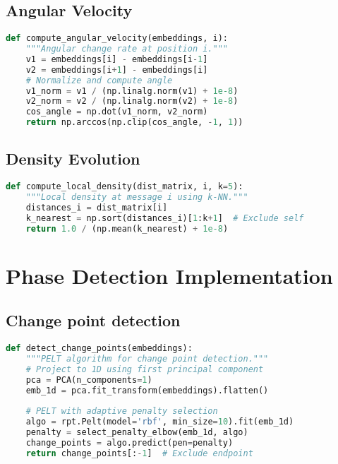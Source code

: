 \documentclass[11pt,letterpaper]{article}
\begin{document}
\subsection{Angular Velocity}
\label{app:geometric-signatures-angular-velocity}
\begin{lstlisting}[language=Python, basicstyle=\small]
def compute_angular_velocity(embeddings, i):
    """Angular change rate at position i."""
    v1 = embeddings[i] - embeddings[i-1]
    v2 = embeddings[i+1] - embeddings[i]
    # Normalize and compute angle
    v1_norm = v1 / (np.linalg.norm(v1) + 1e-8)
    v2_norm = v2 / (np.linalg.norm(v2) + 1e-8)
    cos_angle = np.dot(v1_norm, v2_norm)
    return np.arccos(np.clip(cos_angle, -1, 1))
\end{lstlisting}

\subsection{Density Evolution}
\label{app:geometric-signatures-density-evolution}
\begin{lstlisting}[language=Python, basicstyle=\small]
def compute_local_density(dist_matrix, i, k=5):
    """Local density at message i using k-NN."""
    distances_i = dist_matrix[i]
    k_nearest = np.sort(distances_i)[1:k+1]  # Exclude self
    return 1.0 / (np.mean(k_nearest) + 1e-8)
\end{lstlisting}

\section{Phase Detection Implementation}
\label{app:phase-detection}

\subsection{Change point detection}
\label{app:phase-detection-change-point}
\begin{lstlisting}[language=Python]
def detect_change_points(embeddings):
    """PELT algorithm for change point detection."""
    # Project to 1D using first principal component
    pca = PCA(n_components=1)
    emb_1d = pca.fit_transform(embeddings).flatten()
    
    # PELT with adaptive penalty selection
    algo = rpt.Pelt(model='rbf', min_size=10).fit(emb_1d)
    penalty = select_penalty_elbow(emb_1d, algo)
    change_points = algo.predict(pen=penalty)
    return change_points[:-1]  # Exclude endpoint
\end{lstlisting}
\end{document}
